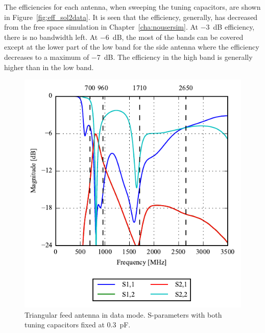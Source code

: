 The efficiencies for each antenna, when sweeping the tuning capacitors, are shown in Figure~\ref{fig:eff_sol2data}. It is seen that the efficiency, generally, has decreased from the free space simulation in Chapter~\ref{cha:nousersim}. At  \SI{-3}{dB} efficiency, there is no bandwidth left. At \SI{-6}{dB}, the most of the bands can be covered except at the lower part of the low band for the side antenna where the efficiency decreases to a maximum of \SI{-7}{dB}. The efficiency in the high band is generally higher than in the low band.

\begin{figure}[htbp]
    \centering
    \includegraphics{img/tech_sol/trianglefeed/data_mode/sparams.pdf}
    \caption{Triangular feed antenna in data mode. S-parameters with both tuning capacitors fixed at \SI{0.3}{pF}.}
    \label{fig:triang_sparam_data}
\end{figure}


